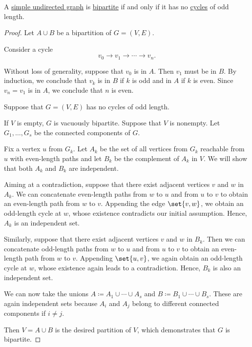 \begin{proposition}\label{thm:bipartite_iff_no_odd_cycles}
  A \hyperref[def:undirected_graph]{simple undirected graph} is \hyperref[def:multipartite_graph]{bipartite} if and only if it has no \hyperref[def:graph_cycle]{cycles} of odd length.
\end{proposition}
\begin{proof}
  \SufficiencySubProof Let \( A \cup B \) be a bipartition of \( G = (V, E) \).

  Consider a cycle
  \begin{equation*}
    v_0 \to v_1 \to \cdots \to v_n.
  \end{equation*}

  Without loss of generality, suppose that \( v_0 \) is in \( A \). Then \( v_1 \) must be in \( B \). By induction, we conclude that \( v_k \) is in \( B \) if \( k \) is odd and in \( A \) if \( k \) is even. Since \( v_n = v_1 \) is in \( A \), we conclude that \( n \) is even.

  \NecessitySubProof Suppose that \( G = (V, E) \) has no cycles of odd length.

  If \( V \) is empty, \( G \) is vacuously bipartite. Suppose that \( V \) is nonempty. Let \( G_1, \ldots, G_s \) be the connected components of \( G \).

  Fix a vertex \( u \) from \( G_k \). Let \( A_k \) be the set of all vertices from \( G_k \) reachable from \( u \) with even-length paths and let \( B_k \) be the complement of \( A_k \) in \( V \). We will show that both \( A_k \) and \( B_k \) are independent.

  Aiming at a contradiction, suppose that there exist adjacent vertices \( v \) and \( w \) in \( A_k \). We can concatenate even-length paths from \( w \) to \( u \) and from \( u \) to \( v \) to obtain an even-length path from \( w \) to \( v \). Appending the edge \( \set{ v, w } \), we obtain an odd-length cycle at \( w \), whose existence contradicts our initial assumption. Hence, \( A_k \) is an independent set.

  Similarly, suppose that there exist adjacent vertices \( v \) and \( w \) in \( B_k \). Then we can concatenate odd-length paths from \( w \) to \( u \) and from \( u \) to \( v \) to obtain an even-length path from \( w \) to \( v \). Appending \( \set{ u, v } \), we again obtain an odd-length cycle at \( w \), whose existence again leads to a contradiction. Hence, \( B_k \) is also an independent set.

  We can now take the unions \( A \coloneqq A_1 \cup \cdots \cup A_s \) and \( B \coloneqq B_1 \cup \cdots \cup B_s \). These are again independent sets because \( A_i \) and \( A_j \) belong to different connected components if \( i \neq j \).

  Then \( V = A \cup B \) is the desired partition of \( V \), which demonstrates that \( G \) is bipartite.
\end{proof}

